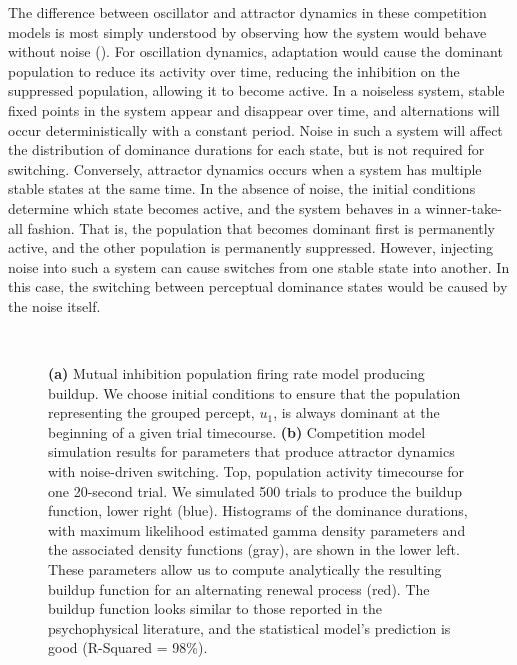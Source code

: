 The difference between oscillator and attractor dynamics in these competition models is most simply understood by observing how the system would behave without noise (\cite{Shpiro2009, Moreno-Bote2007}). For oscillation dynamics, adaptation would cause the dominant population to reduce its activity over time, reducing the inhibition on the suppressed population, allowing it to become active. In a noiseless system, stable fixed points in the system appear and disappear over time, and alternations will occur deterministically with a constant period. Noise in such a system will affect the distribution of dominance durations for each state, but is not required for switching. Conversely, attractor dynamics occurs when a system has multiple stable states at the same time. In the absence of noise, the initial conditions determine which state becomes active, and the system behaves in a winner-take-all fashion. That is, the population that becomes dominant first is permanently active, and the other population is permanently suppressed. However, injecting noise into such a system can cause switches from one stable state into another. In this case, the switching between perceptual dominance states would be caused by the noise itself. 

\begin{wrapfigure}{L}{.6\textwidth}
	\centering
	 \\
	\vspace{20 pt}
	
	\caption{\textbf{(a)} Mutual inhibition population firing rate model producing buildup. We choose initial conditions to ensure that the population representing the grouped percept, $u_1$, is always dominant at the beginning of a given trial timecourse. \textbf{(b)} Competition model simulation results for parameters that produce attractor dynamics with noise-driven switching. Top, population activity timecourse for one 20-second trial. We simulated 500 trials to produce the buildup function, lower right (blue). Histograms of the dominance durations, with maximum likelihood estimated gamma density parameters and the associated density functions (gray), are shown in the lower left. These parameters allow us to compute analytically the resulting buildup function for an alternating renewal process (red).  The buildup function looks similar to those reported in the psychophysical literature, and the statistical model's prediction is good (R-Squared = 98\%).}
	\label{fig:making_comp_BUFs}
\end{wrapfigure}


